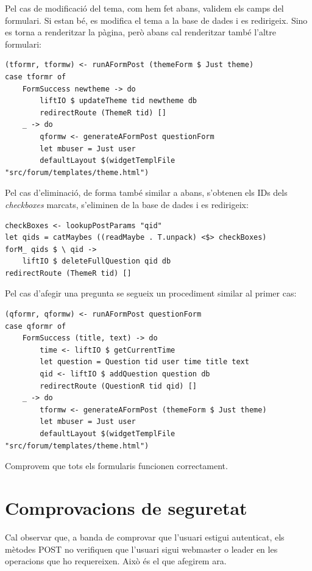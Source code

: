 \documentclass[catalan, a4paper]{scrartcl}
\begin{document}
Pel cas de modificació del tema, com hem fet abans, validem els camps del
formulari. Si estan bé, es modifica el tema a la base de dades i es redirigeix.
Sino es torna a renderitzar la pàgina, però abans cal renderitzar també l'altre
formulari:

\begin{verbatim}
(tformr, tformw) <- runAFormPost (themeForm $ Just theme)
case tformr of
    FormSuccess newtheme -> do
        liftIO $ updateTheme tid newtheme db
        redirectRoute (ThemeR tid) []
    _ -> do
        qformw <- generateAFormPost questionForm
        let mbuser = Just user
        defaultLayout $(widgetTemplFile "src/forum/templates/theme.html")
\end{verbatim}

Pel cas d'eliminació, de forma també similar a abans, s'obtenen els IDs dels
\emph{checkboxes} marcats, s'eliminen de la base de dades i es redirigeix:

\begin{verbatim}
checkBoxes <- lookupPostParams "qid"
let qids = catMaybes ((readMaybe . T.unpack) <$> checkBoxes)
forM_ qids $ \ qid ->
    liftIO $ deleteFullQuestion qid db
redirectRoute (ThemeR tid) []
\end{verbatim}

Pel cas d'afegir una pregunta se segueix un procediment similar al primer cas:

\begin{verbatim}
(qformr, qformw) <- runAFormPost questionForm
case qformr of
    FormSuccess (title, text) -> do
        time <- liftIO $ getCurrentTime
        let question = Question tid user time title text
        qid <- liftIO $ addQuestion question db
        redirectRoute (QuestionR tid qid) []
    _ -> do
        tformw <- generateAFormPost (themeForm $ Just theme)
        let mbuser = Just user
        defaultLayout $(widgetTemplFile "src/forum/templates/theme.html")
\end{verbatim}

Comprovem que tots els formularis funcionen correctament.


\clearpage
\section{Comprovacions de seguretat}

Cal observar que, a banda de comprovar que l'usuari estigui autenticat,
els mètodes \textsf{POST} no verifiquen que l'usuari sigui webmaster o
leader en les operacions que ho requereixen. Això és el que afegirem ara.
\end{document}
